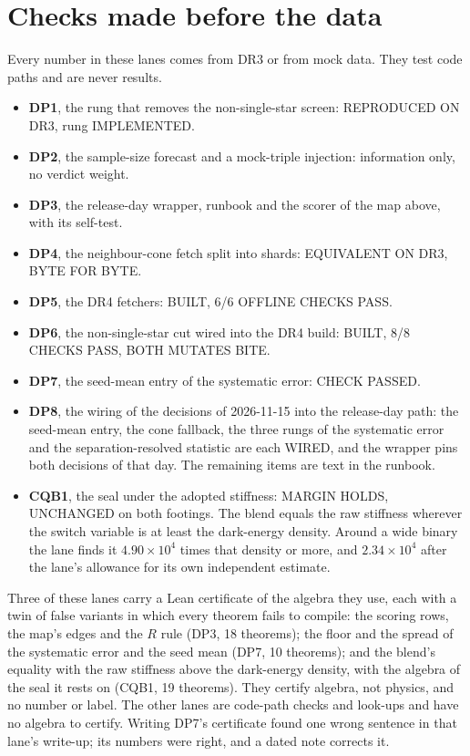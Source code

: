 \documentclass[10pt]{article}
\begin{document}
\section{Checks made before the data}
Every number in these lanes comes from DR3 or from mock data. They test code paths and are never results.
\begin{itemize}
\item \textbf{DP1}, the rung that removes the non-single-star screen: REPRODUCED ON DR3, rung IMPLEMENTED.
\item \textbf{DP2}, the sample-size forecast and a mock-triple injection: information only, no verdict weight.
\item \textbf{DP3}, the release-day wrapper, runbook and the scorer of the map above, with its self-test.
\item \textbf{DP4}, the neighbour-cone fetch split into shards: EQUIVALENT ON DR3, BYTE FOR BYTE.
\item \textbf{DP5}, the DR4 fetchers: BUILT, 6/6 OFFLINE CHECKS PASS.
\item \textbf{DP6}, the non-single-star cut wired into the DR4 build: BUILT, 8/8 CHECKS PASS, BOTH MUTATES BITE.
\item \textbf{DP7}, the seed-mean entry of the systematic error: CHECK PASSED.
\item \textbf{DP8}, the wiring of the decisions of 2026-11-15 into the release-day path: the seed-mean entry, the cone fallback, the three rungs of the systematic error and the separation-resolved statistic are each WIRED, and the wrapper pins both decisions of that day. The remaining items are text in the runbook.
\item \textbf{CQB1}, the seal under the adopted stiffness: MARGIN HOLDS, UNCHANGED on both footings. The blend equals the raw stiffness wherever the switch variable is at least the dark-energy density. Around a wide binary the lane finds it $4.90\times10^4$ times that density or more, and $2.34\times10^4$ after the lane's allowance for its own independent estimate.
\end{itemize}
Three of these lanes carry a Lean certificate of the algebra they use, each with a twin of false variants in which every theorem fails to compile: the scoring rows, the map's edges and the $R$ rule (DP3, 18 theorems); the floor and the spread of the systematic error and the seed mean (DP7, 10 theorems); and the blend's equality with the raw stiffness above the dark-energy density, with the algebra of the seal it rests on (CQB1, 19 theorems). They certify algebra, not physics, and no number or label. The other lanes are code-path checks and look-ups and have no algebra to certify. Writing DP7's certificate found one wrong sentence in that lane's write-up; its numbers were right, and a dated note corrects it.
\end{document}
